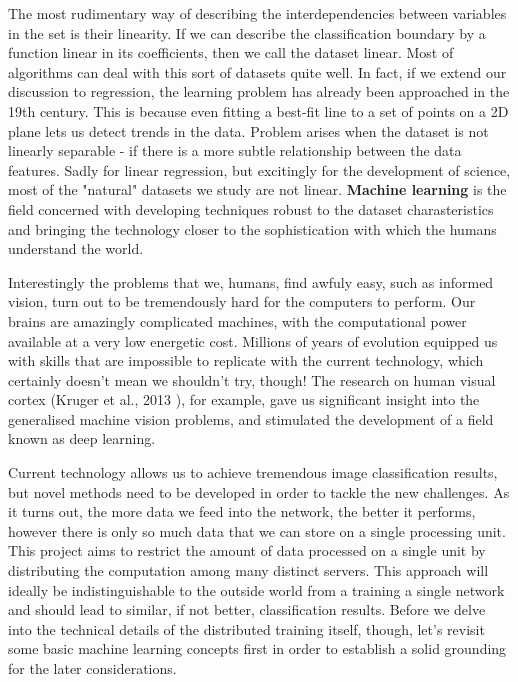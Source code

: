 \documentclass[a4paper, 11pt]{article}
\numberwithin{equation}{section}
\begin{document}
	The most rudimentary way of describing the interdependencies between variables in the set is their linearity. If we can describe the classification boundary by a function linear in its coefficients, then we call the dataset linear. Most of algorithms can deal with this sort of datasets quite well. In fact, if we extend our discussion to regression, the learning problem has already been approached in the 19th century. This is because even fitting a best-fit line to a set of points on a 2D plane lets us detect trends in the data. Problem arises when the dataset is not linearly separable - if there is a more subtle relationship between the data features. Sadly for linear regression, but excitingly for the development of science, most of the "natural" datasets we study are not linear. \textbf{Machine learning} is the field concerned with developing techniques robust to the dataset charasteristics and bringing the technology closer to the sophistication with which the humans understand the world.
	
	Interestingly the problems that we, humans, find awfuly easy, such as informed vision, turn out to be tremendously hard for the computers to perform. Our brains are amazingly complicated machines, with the computational power available at a very low energetic cost. Millions of years of evolution equipped us with skills that are impossible to replicate with the current technology, which certainly doesn't mean we shouldn't try, though! The research on human visual cortex (Kruger et al., 2013 \cite{kruger2013deep}), for example, gave us significant insight into the generalised machine vision problems, and stimulated the development of a field known as deep learning.
	
	Current technology allows us to achieve tremendous image classification results, but novel methods need to be developed in order to tackle the new challenges. As it turns out, the more data we feed into the network, the better it performs, however there is only so much data that we can store on a single processing unit. This project aims to restrict the amount of data processed on a single unit by distributing the computation among many distinct servers. This approach will ideally be indistinguishable to the outside world from a training a single network and should lead to similar, if not better, classification results. Before we delve into the technical details of the distributed training itself, though, let's revisit some basic machine learning concepts first in order to establish a solid grounding for the later considerations.
	
\end{document}
